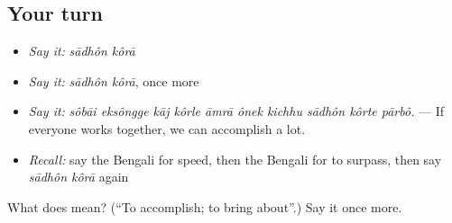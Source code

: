 \subsection*{Your turn}
\begin{itemize}
\raggedright
  \item \emph{Say it:} \emph{sādhôn kôrā}
  \item \emph{Say it:} \emph{sādhôn kôrā}, once more
  \item \emph{Say it:} \emph{sôbāi eksôngge kāj kôrle āmrā ônek kichhu sādhôn kôrte pārbô.} — If everyone works together, we can accomplish a lot.
  \item \emph{Recall:} say the Bengali for speed, then the Bengali for to surpass, then say \emph{sādhôn kôrā} again
\end{itemize}

\begin{tcolorbox}[breakable,colback=teal!4,colframe=teal!35!black,title={Before you move on}]
What does   mean? (\textquotedblleft{}To accomplish; to bring about\textquotedblright{}.) Say it once more.
\end{tcolorbox}
